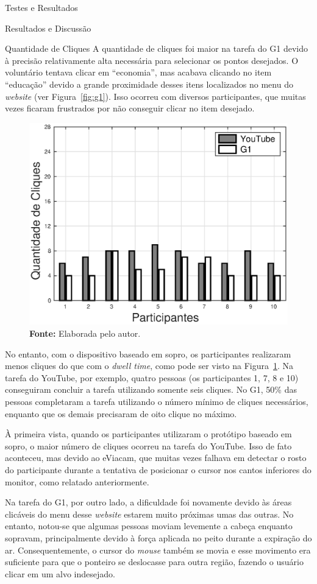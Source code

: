 \begin{chapter}{Testes e Resultados}
\begin{section}{Resultados e Discussão}
\begin{subsection}{Quantidade de Cliques}
A quantidade de cliques foi maior na tarefa do G1 devido à precisão
relativamente alta necessária para selecionar os pontos desejados. O voluntário
tentava clicar em ``economia'', mas acabava clicando no item ``educação'' devido
a grande proximidade desses itens localizados no menu do \textit{website}
(ver Figura~\ref{fig:g1}). Isso ocorreu com diversos participantes, que muitas
vezes ficaram frustrados por não conseguir clicar no item desejado.
\vspace{-0.5cm}
\begin{figure}[!h]
	\centering
	\includegraphics[width=0.7\linewidth]{fig/PuffClicks}
	\caption{Quantidade de cliques de cada tarefa, utilizando o dispositivo baseado em sopro.}
	\vspace{-1cm}
	\caption*{\textbf{Fonte: }Elaborada pelo autor.}
	\label{fig:puffclicks}
\end{figure}

No entanto, com o dispositivo baseado em sopro, os participantes realizaram
menos cliques do que com o \textit{dwell time}, como pode ser visto na
Figura~\ref{fig:puffclicks}. Na tarefa do YouTube, por exemplo, quatro pessoas
(os participantes 1, 7, 8 e 10) conseguiram concluir a tarefa utilizando somente
seis cliques. No G1, 50\% das pessoas completaram a tarefa utilizando o número
mínimo de cliques necessários, enquanto que os demais precisaram de oito clique
no máximo.

À primeira vista, quando os participantes utilizaram o protótipo baseado em
sopro, o maior número de cliques ocorreu na tarefa do YouTube. Isso de fato
aconteceu, mas devido ao eViacam, que muitas vezes falhava em detectar o rosto
do participante durante a tentativa de posicionar o cursor nos cantos inferiores
do monitor, como relatado anteriormente.
  
Na tarefa do G1, por outro lado, a dificuldade foi novamente devido às áreas
clicáveis do menu desse \textit{website} estarem muito próximas umas das
outras. No entanto, notou-se que algumas pessoas moviam levemente a cabeça
enquanto sopravam, principalmente devido à força aplicada no peito durante a
expiração do ar. Consequentemente, o cursor do \textit{mouse} também se movia e
esse movimento era suficiente para que o ponteiro se deslocasse para outra
região, fazendo o usuário clicar em um alvo indesejado.
\end{subsection}


\end{section}
\end{chapter}
